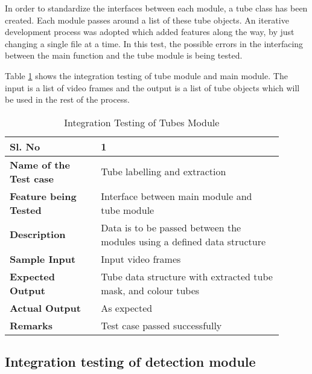    In order to standardize the interfaces between each module, a tube class has
    been created. Each module passes around a list of these tube objects. An
    iterative development process was adopted which added features along the
    way, by just changing a single file at a time. In this test, the possible
    errors in the interfacing between the main function and the tube
    module is being tested.

    Table \ref{table:integration-tubes} shows the integration testing of tube
    module and main module. The input is a list of video frames and the output
    is a list of tube objects which will be used in the rest of the process.

    \FloatBarrier
    \begin{table}[H]
        \caption{Integration Testing of Tubes Module}
        \begin{tabular}{|p{0.3\linewidth}|p{0.6\linewidth}|}
            \hline
            \textbf{Sl. No }              &\textbf{ 1}\\
            \hline
            \textbf{Name of the Test case}& Tube labelling and extraction \\
            \hline
            \textbf{Feature being Tested}  & Interface between main module and
            tube module \\
            \hline
            \textbf{Description}           & Data is to be passed between the
            modules using a defined data structure \\
            \hline
            \textbf{Sample Input}          & Input video frames \\
            \hline
            \textbf{Expected Output}       & Tube data structure with
            extracted tube mask, and colour tubes \\
            \hline
            \textbf{Actual Output}         & As expected \\
            \hline
            \textbf{Remarks }              & Test case passed successfully \\
            \hline
        \end{tabular}
        \label{table:integration-tubes}
    \end{table}


    \subsection{Integration testing of detection module}

